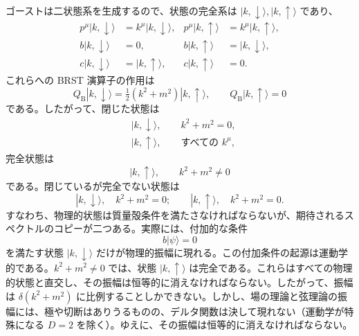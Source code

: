 ゴーストは二状態系を生成するので、状態の完全系は $|k,\downarrow\rangle,|k,\uparrow\rangle$ であり、
\begin{align}
p^\mu|k,\downarrow\rangle&=k^\mu|k,\downarrow\rangle,
&p^\mu|k,\uparrow\rangle&=k^\mu|k,\uparrow\rangle,
\tag{4.2.28a}\label{eq:4.2.28a}\\
b|k,\downarrow\rangle&=0,
&b|k,\uparrow\rangle&=|k,\downarrow\rangle,
\tag{4.2.28b}\label{eq:4.2.28b}\\
c|k,\downarrow\rangle&=|k,\uparrow\rangle,
&c|k,\uparrow\rangle&=0.
\tag{4.2.28c}\label{eq:4.2.28c}
\end{align}
これらへの BRST 演算子の作用は
\begin{equation}
Q_{\mathrm B}|k,\downarrow\rangle=\tfrac12(k^2+m^2)|k,\uparrow\rangle,
\qquad Q_{\mathrm B}|k,\uparrow\rangle=0
\tag{4.2.29}\label{eq:4.2.29}
\end{equation}
である。したがって、閉じた状態は
\begin{align}
&|k,\downarrow\rangle,\qquad k^2+m^2=0,
\tag{4.2.30a}\label{eq:4.2.30a}\\
&|k,\uparrow\rangle,\qquad \text{すべての }k^\mu,
\tag{4.2.30b}\label{eq:4.2.30b}
\end{align}
完全状態は
\begin{equation}
|k,\uparrow\rangle,\qquad k^2+m^2\neq0
\tag{4.2.31}\label{eq:4.2.31}
\end{equation}
である。閉じているが完全でない状態は
\begin{equation}
|k,\downarrow\rangle,\quad k^2+m^2=0;
\qquad |k,\uparrow\rangle,\quad k^2+m^2=0.
\tag{4.2.32}\label{eq:4.2.32}
\end{equation}
すなわち、物理的状態は質量殻条件を満たさなければならないが、期待されるスペクトルのコピーが二つある。実際には、付加的な条件
\begin{equation}
b|\psi\rangle=0
\tag{4.2.33}\label{eq:4.2.33}
\end{equation}
を満たす状態 $|k,\downarrow\rangle$ だけが物理的振幅に現れる。この付加条件の起源は運動学的である。$k^2+m^2\neq0$ では、状態 $|k,\uparrow\rangle$ は完全である。これらはすべての物理的状態と直交し、その振幅は恒等的に消えなければならない。したがって、振幅は $\delta(k^2+m^2)$ に比例することしかできない。しかし、場の理論と弦理論の振幅には、極や切断はありうるものの、デルタ関数は決して現れない（運動学が特殊になる $D=2$ を除く）。ゆえに、その振幅は恒等的に消えなければならない。

\label{sec:4.3}

